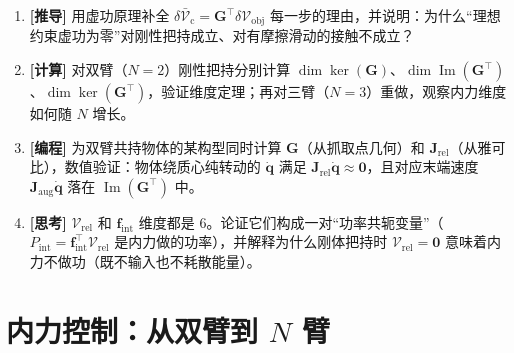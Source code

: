 \begin{exercise}
\begin{enumerate}
  \item \textbf{[推导]} 用虚功原理补全 $\delta\bar{\boldsymbol{\mathcal{V}}}_{\text{c}}=\mathbf{G}^\top\delta\boldsymbol{\mathcal{V}}_{\text{obj}}$ 每一步的理由，并说明：为什么“理想约束虚功为零”对刚性把持成立、对有摩擦滑动的接触不成立？
  \item \textbf{[计算]} 对双臂（$N=2$）刚性把持分别计算 $\dim\ker(\mathbf{G})$、$\dim\operatorname{Im}(\mathbf{G}^\top)$、$\dim\ker(\mathbf{G}^\top)$，验证维度定理；再对三臂（$N=3$）重做，观察内力维度如何随 $N$ 增长。
  \item \textbf{[编程]} 为双臂共持物体的某构型同时计算 $\mathbf{G}$（从抓取点几何）和 $\mathbf{J}_{\text{rel}}$（从雅可比），数值验证：物体绕质心纯转动的 $\dot{\mathbf{q}}$ 满足 $\mathbf{J}_{\text{rel}}\dot{\mathbf{q}}\approx\mathbf{0}$，且对应末端速度 $\mathbf{J}_{\text{aug}}\dot{\mathbf{q}}$ 落在 $\operatorname{Im}(\mathbf{G}^\top)$ 中。
  \item \textbf{[思考]} $\boldsymbol{\mathcal{V}}_{\text{rel}}$ 和 $\mathbf{f}_{\text{int}}$ 维度都是 $6$。论证它们构成一对“功率共轭变量”（$P_{\text{int}}=\mathbf{f}_{\text{int}}^\top\boldsymbol{\mathcal{V}}_{\text{rel}}$ 是内力做的功率），并解释为什么刚体把持时 $\boldsymbol{\mathcal{V}}_{\text{rel}}=\mathbf{0}$ 意味着内力不做功（既不输入也不耗散能量）。
\end{enumerate}
\end{exercise}

\section{内力控制：从双臂到 $N$ 臂}
\label{sec:ma-internalforce}

